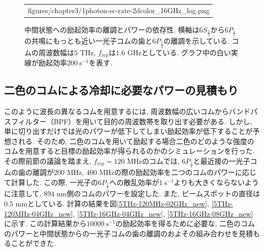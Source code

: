 \documentclass[uplatex, dvipdfmx, a4paper, report, papersize, 11pt]{jsbook}
\begin{document}
\begin{figure}[H]
\begin{tabular}{c}
\begin{minipage}{1\hsize}
                          {figures/chapter3/1photon-sc-rate-2dcolor_16GHz_log.png}
                          \caption{中間状態への励起効率の離調とパワーの依存性. 横軸は$6S_{\frac{1}{2}}$から$6P_{\frac{1}{2}}$の共鳴にもっとも近い一光子コムの歯と$6P_{\frac{1}{2}}$の離調を示している. コムの周波数幅は$5$ THz, $f_{\mathrm{rep}}$は$1.6$ GHzとしている. グラフ中の白い実線が励起効率$200\
                          \mathrm{s^{-1}}$を表す. }
                          \label{1photon-sc-rate-2dcolor_16GHz_log}
      \end{minipage}
    \end{tabular}
\end{figure}
\newpage
\subsection{二色のコムによる冷却に必要なパワーの見積もり}
このように波長の異なるコムを用意するには, 周波数幅の広いコムからバンドパスフィルター（BPF）を用いて目的の周波数帯を取り出す必要がある. しかし, 単に切り出すだけでは光のパワーが低下してしまい励起効率が低下することが予想される. そのため, 二色のコムを用いて励起する場合二色のどのような強度のコムを用意すると目標の励起効率が得られるのかのシミュレーションを行った. その際前節の議論を踏まえ, $f_{\mathrm{rep}} = 120$ MHzのコムでは, $6P_{\frac{1}{2}}$と最近接の一光子コムの歯の離調が$200$ MHz, $400$ MHzの際の励起効率を二つのコムのパワーに応じて計算した. この際, 一光子の$6P_{\frac{1}{2}}$への散乱効率が$1\ \mathrm{s^{-1}}$よりも大きくならないように注意して, $894$ nm側のコムのパワーを設定した. また, ビームスポットの直径は$0.5$ mmとしている. 計算の結果を図\ref{5THz-120MHz-02GHz_new}, \ref{5THz-120MHz-04GHz_new}, \ref{5THz-16GHz-04GHz_new}, \ref{5THz-16GHz-08GHz_new}に示す. この計算結果から$10000\ \mathrm{s^{-1}}$の励起効率を得るために必要な, 二色のコムのパワーと中間状態からの一光子コムの歯の離調のおよその組み合わせを見積もることができた.
\end{document}
